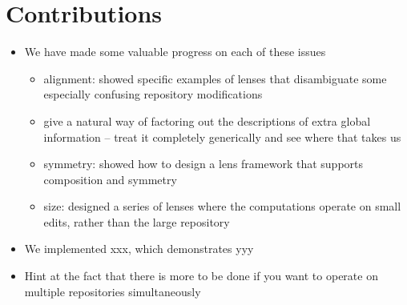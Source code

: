 \section{Contributions}
\label{sec:contributions}
\begin{itemize}
    \item We have made some valuable progress on each of these issues
        \begin{itemize}
            \item alignment: showed specific examples of lenses that
                disambiguate some especially confusing repository
                modifications
            \item give a natural way of factoring out the descriptions of
                extra global information -- treat it completely generically
                and see where that takes us
            \item symmetry: showed how to design a lens framework that
                supports composition and symmetry
            \item size: designed a series of lenses where the computations
                operate on small edits, rather than the large repository
        \end{itemize}
    \item We implemented xxx, which demonstrates yyy
    \item Hint at the fact that there is more to be done if you want to
        operate on multiple repositories simultaneously
\end{itemize}
